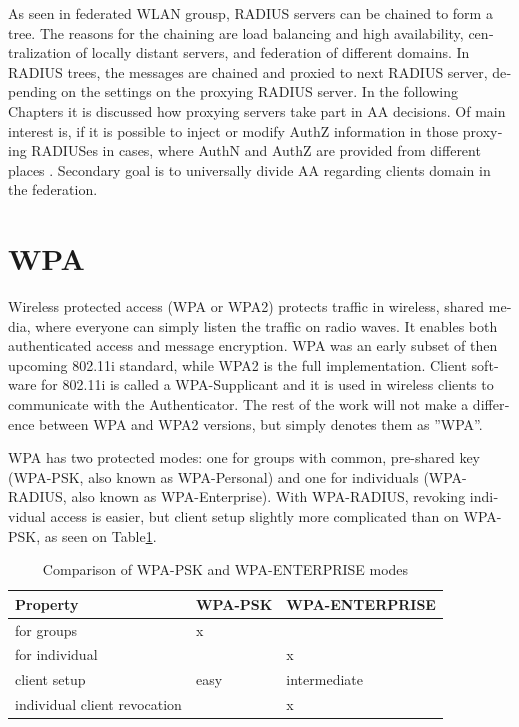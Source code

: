 \documentclass[12pt,a4paper,english]{tutthesis}
\begin{document}
\begin{otherlanguage}{english}
As seen in federated WLAN grousp, RADIUS servers can be chained to
form a tree.
The reasons for the chaining are load balancing and high availability, 
centralization of locally distant servers, and federation of different
domains. 
In RADIUS trees, the messages are chained and
proxied to next RADIUS server,
depending on the settings on the proxying RADIUS server.
In the following Chapters it is discussed how proxying servers take 
part in AA decisions. Of main interest is, if it is possible 
to inject or modify AuthZ information in those proxying RADIUSes in
cases, where AuthN and AuthZ are provided from different places
\cite{rfc2607}. Secondary goal is to universally divide AA regarding 
clients domain in the federation.





\section{WPA}
\label{sec-2-3}

Wireless protected access (WPA or WPA2) protects traffic in wireless,
shared media, where everyone can simply listen the traffic on
radio waves. It enables both authenticated access and message
encryption. WPA was an early subset of then upcoming 802.11i standard,
while WPA2 is the full implementation.
Client software for 802.11i is called a WPA-Supplicant and it is used
in wireless clients to communicate with the Authenticator. The rest of
the work will not make a difference between WPA and WPA2 versions, but
simply denotes them as ''WPA''.

WPA has two protected modes: one for groups with common, pre-shared
key (WPA-PSK, also known as WPA-Personal) and one for individuals
(WPA-RADIUS, also known as  WPA-Enterprise).  With WPA-RADIUS, revoking
individual access is easier, but client setup slightly more
complicated than on WPA-PSK, as seen on Table\ref{psk-enterprise}.

\begin{table}[htb]
\caption{\label{psk-enterprise}Comparison of WPA-PSK and WPA-ENTERPRISE modes}
\centering
\begin{tabular}{lll}
Property & WPA-PSK & WPA-ENTERPRISE\\
\hline
for groups & x & \\
for individual &  & x\\
client setup & easy & intermediate\\
individual client revocation &  & x\\
\hline
\end{tabular}
\end{table}



\end{otherlanguage}
\end{document}
